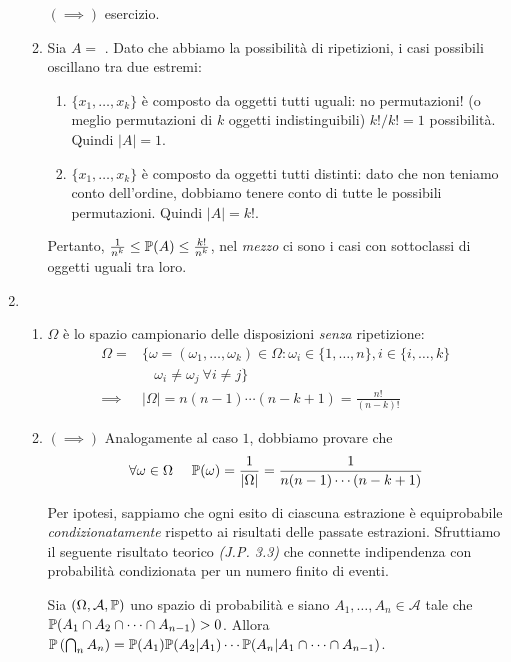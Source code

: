 \begin{enumerate}
\begin{enumerate}
		$(\implies)$ esercizio.
		\item Sia $A=$ . Dato che abbiamo la possibilità di ripetizioni, i casi possibili oscillano tra due estremi:
		\begin{enumerate}
			\item $\{x_{1},\dots,x_{k}\}$ è composto da oggetti tutti uguali: no permutazioni! (o meglio permutazioni di $k$ oggetti indistinguibili) $k!/k!=1$ possibilità. Quindi $| A| =1$.
			\item $\{x_{1},\dots,x_{k}\}$ è composto da oggetti tutti distinti: dato che non teniamo conto dell'ordine, dobbiamo tenere conto di tutte le possibili permutazioni. Quindi $| A| =k!$.
		\end{enumerate}

		Pertanto, $\frac{1}{n^{k}} \leq \mathbb{P}(A) \leq \frac{k!}{n^{k}}$, nel \textit{mezzo} ci sono i casi con sottoclassi di oggetti uguali tra loro.
	\end{enumerate}
	\item 
	\begin{enumerate}
		\item $\Omega $ è lo spazio campionario delle disposizioni \textit{senza} ripetizione:
		\begin{align*}
			\Omega = & \{\omega =(\omega _{1} ,\dots ,\omega _{k}) \in \Omega :\omega _{i} \in \{1,\dots,n\} ,i\in \{i,\dots,k\}\\
			 & \ \ \ \ \omega _{i} \neq \omega _{j} \ \forall i\neq j\}\\
			\implies  & | \Omega | =n(n-1) \cdots (n-k+1) =\frac{n!}{(n-k) !}
		\end{align*}
		\item $(\implies)$ Analogamente al caso $1$, dobbiamo provare che
		\begin{equation*}
			\forall \omega \in \Omega \ \ \ \ \mathbb{P}(\omega) =\frac{1}{| \Omega | } =\frac{1}{n(n-1) \cdots (n-k+1)}
		\end{equation*}

		Per ipotesi, sappiamo che ogni esito di ciascuna estrazione è equiprobabile \textit{condizionatamente} rispetto ai risultati delle passate estrazioni. Sfruttiamo il seguente risultato teorico \textit{(J.P. 3.3)} che connette indipendenza con probabilità condizionata per un numero finito di eventi.

		Sia $(\Omega ,\mathcal{A} ,\mathbb{P})$ uno spazio di probabilità e siano $A_{1} ,\dots ,A_{n} \in \mathcal{A}$ tale che $\mathbb{P}(A_{1} \cap A_{2} \cap \cdots \cap A_{n-1})  >0$. Allora $\mathbb{P}\left(\bigcap _{n} A_{n}\right) =\mathbb{P}(A_{1})\mathbb{P}(A_{2} |A_{1}) \cdots \mathbb{P}(A_{n} |A_{1} \cap \cdots \cap A_{n-1})$.


\end{enumerate}
\end{enumerate}
